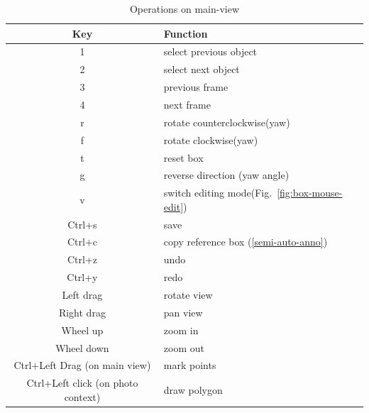 \documentclass[letterpaper, 10 pt, conference]{ieeeconf}  %
\begin{document}
\begin{table}[h]
	\caption{Operations on main-view}
	\label{table:keyboard_mainview}
	\begin{center}
		\begin{tabular}{|c|l|}
			\hline
			\textbf{Key} & \textbf{Function}\\
			\hline
			1 & select previous object\\
			\hline
			2 & select next object\\
			\hline
			3 & previous frame\\
			\hline
			4 & next frame\\
			\hline
			r & rotate counterclockwise(yaw)\\
			\hline
			f & rotate clockwise(yaw)\\
			\hline
			t & reset box\\
			\hline
			g & reverse direction (yaw angle)\\
			\hline
			v & switch editing mode(Fig.~\ref{fig:box-mouse-edit})\\
			\hline
			Ctrl+s & save\\
			\hline
			Ctrl+c & copy reference box (\ref{semi-auto-anno})\\
			\hline
			Ctrl+z & undo\\
			\hline
			Ctrl+y & redo\\
			\hline
			Left drag & rotate view\\
			\hline
			Right drag & pan view\\
			\hline
			Wheel up & zoom in\\
			\hline
			Wheel down & zoom out\\
			\hline
			Ctrl+Left Drag (on main view)& mark points\\
			\hline
			Ctrl+Left click (on photo context)& draw polygon\\
			\hline
		\end{tabular}
	\end{center}
\end{table}
\end{document}
